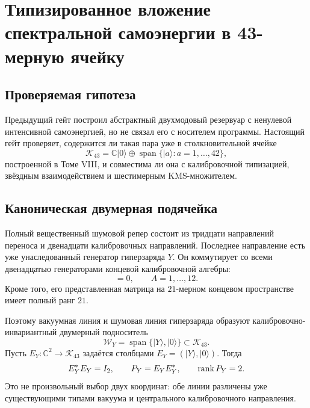 \chapter{Типизированное вложение спектральной самоэнергии в 43-мерную ячейку}
\label{ch:v10-inflow-spectral-self-energy-k43-typed-embedding}

\section{Проверяемая гипотеза}

Предыдущий гейт построил абстрактный двухмодовый резервуар с ненулевой
интенсивной самоэнергией, но не связал его с носителем программы. Настоящий
гейт проверяет, содержится ли такая пара уже в столкновительной ячейке
\begin{equation}
 \mathcal K_{43}=\mathbb C|0\rangle\oplus
 \operatorname{span}\{|a\rangle:a=1,\ldots,42\},
 \label{eq:v10-k43-cell}
\end{equation}
построенной в Томе VIII, и совместима ли она с калибровочной типизацией,
звёздным взаимодействием и шестимерным KMS-множителем.

\section{Каноническая двумерная подячейка}

Полный вещественный шумовой репер состоит из тридцати направлений переноса и
двенадцати калибровочных направлений. Последнее направление есть уже
унаследованный генератор гиперзаряда $Y$. Он коммутирует со всеми
двенадцатью генераторами концевой калибровочной алгебры:
\begin{equation}
 [X_A,Y]=0,
 \qquad A=1,\ldots,12.
 \label{eq:v10-hypercharge-invariant-line}
\end{equation}
Кроме того, его представленная матрица на $21$-мерном концевом пространстве
имеет полный ранг $21$.

Поэтому вакуумная линия и шумовая линия гиперзаряда образуют
калибровочно-инвариантный двумерный подноситель
\begin{equation}
 \mathcal W_Y=\operatorname{span}\{|Y\rangle,|0\rangle\}
 \subset\mathcal K_{43}.
 \label{eq:v10-hypercharge-vacuum-subcarrier}
\end{equation}
Пусть $E_Y:\mathbb C^2\to\mathcal K_{43}$ задаётся столбцами
$E_Y=(|Y\rangle,|0\rangle)$. Тогда
\begin{equation}
 E_Y^*E_Y=I_2,
 \qquad P_Y=E_YE_Y^*,
 \qquad \operatorname{rank} P_Y=2.
 \label{eq:v10-k43-typed-isometry}
\end{equation}
Это не произвольный выбор двух координат: обе линии различены уже
существующими типами вакуума и центрального калибровочного направления.

